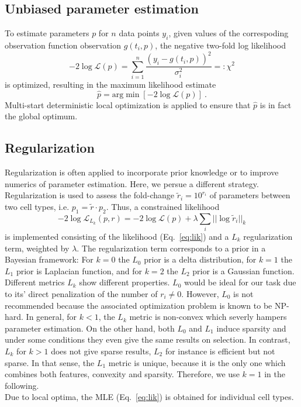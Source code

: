 \documentclass{bioinfo}
\begin{document}
\subsection{Unbiased parameter estimation}

To estimate parameters $p$ for $n$ data points ${y_i}$, given values of the correspoding observation function observation $g(t_i,p)$, the negative two-fold log likelihood
\begin{equation}
-2\log \mathcal L(p) = \sum_{i=1}^n \frac{(y_i-g(t_i,p))^2}{\sigma_i^2} =: \chi^2\label{eq:lik}
\end{equation}
is optimized, resulting in the maximum likelihood estimate
\begin{equation}
\hat p = \text{arg}\min \left[ -2\log \mathcal L(p) \right] \:.
\end{equation}
Multi-start deterministic local optimization is applied to ensure that $\hat p$ is in fact the global optimum.

\subsection{Regularization}
Regularization is often applied to incorporate prior knowledge or to improve numerics of parameter estimation.
Here, we persue a different strategy.
Regularization is used to assess the fold-change $\tilde r_i = 10^{r_i}$ of parameters between two cell types, i.e. $p_1 = \tilde r \cdot p_2$.
Thus, a constrained likelihood
\begin{equation}
-2\log \mathcal L_{L_k}(p,r) = -2\log \mathcal L(p) + \lambda \sum_i ||\log \tilde r_i||_k\label{eq:likreg}%
\end{equation}
is implemented consisting of the likelihood (Eq.~\ref{eq:lik}) and a $L_k$ regularization term, weighted by $\lambda$.
The regularization term corresponds to a prior in a Bayesian framework:
For $k=0$ the $L_0$ prior is a delta distribution, for $k=1$ the $L_1$ prior is Laplacian function, and for $k=2$ the $L_2$ prior is a Gaussian function.\\
Different metrics $L_k$ show different properties.
$L_0$ would be ideal for our task due to its' direct penalization of the number of $r_i \neq 0$.
However, $L_0$ is not recommended because the associated optimization problem is known to be NP-hard.
In general, for $k<1$, the $L_k$ metric is non-convex which severly hampers parameter estimation.
On the other hand, both $L_0$ and $L_1$ induce sparsity and under some conditions they even give the same results on selection.
In contrast, $L_k$ for $k>1$ does not give sparse results, $L_2$ for instance is efficient but not sparse.
In that sense, the $L_1$ metric is unique, because it is the only one which combines both features, convexity and sparsity.
Therefore, we use $k=1$ in the following.\\
Due to local optima, the MLE (Eq.~\ref{eq:lik}) is obtained for individual cell types.
\end{document}
